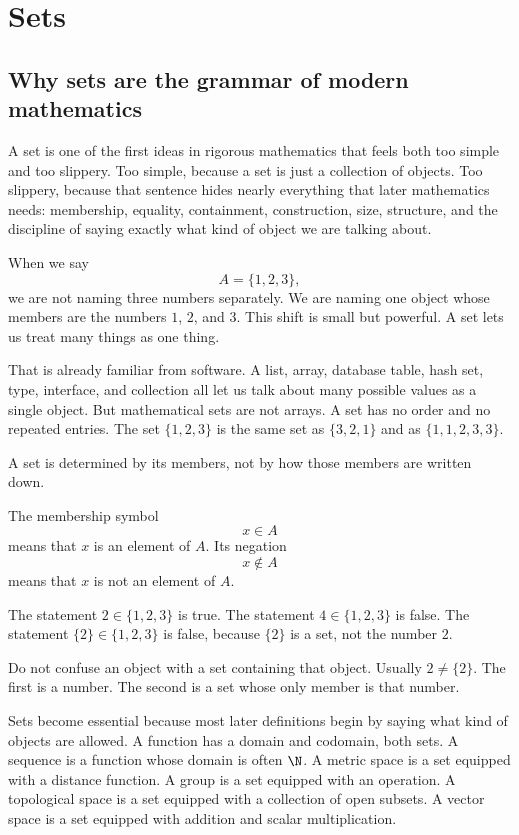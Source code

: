 \section{Sets}

\subsection{Why sets are the grammar of modern mathematics}

A set is one of the first ideas in rigorous mathematics that feels both too simple and too slippery. Too simple, because a set is just a collection of objects. Too slippery, because that sentence hides nearly everything that later mathematics needs: membership, equality, containment, construction, size, structure, and the discipline of saying exactly what kind of object we are talking about.

When we say
\[
A=\{1,2,3\},
\]
we are not naming three numbers separately. We are naming one object whose members are the numbers $1$, $2$, and $3$. This shift is small but powerful. A set lets us treat many things as one thing.

That is already familiar from software. A list, array, database table, hash set, type, interface, and collection all let us talk about many possible values as a single object. But mathematical sets are not arrays. A set has no order and no repeated entries. The set $\{1,2,3\}$ is the same set as $\{3,2,1\}$ and as $\{1,1,2,3,3\}$.

\begin{focusbox}
A set is determined by its members, not by how those members are written down.
\end{focusbox}

The membership symbol
\[
x\in A
\]
means that $x$ is an element of $A$. Its negation
\[
x\notin A
\]
means that $x$ is not an element of $A$.

The statement $2\in\{1,2,3\}$ is true. The statement $4\in\{1,2,3\}$ is false. The statement $\{2\}\in\{1,2,3\}$ is false, because $\{2\}$ is a set, not the number $2$.

\begin{trapbox}
Do not confuse an object with a set containing that object. Usually $2\neq\{2\}$. The first is a number. The second is a set whose only member is that number.
\end{trapbox}

Sets become essential because most later definitions begin by saying what kind of objects are allowed. A function has a domain and codomain, both sets. A sequence is a function whose domain is often $\N$. A metric space is a set equipped with a distance function. A group is a set equipped with an operation. A topological space is a set equipped with a collection of open subsets. A vector space is a set equipped with addition and scalar multiplication.

